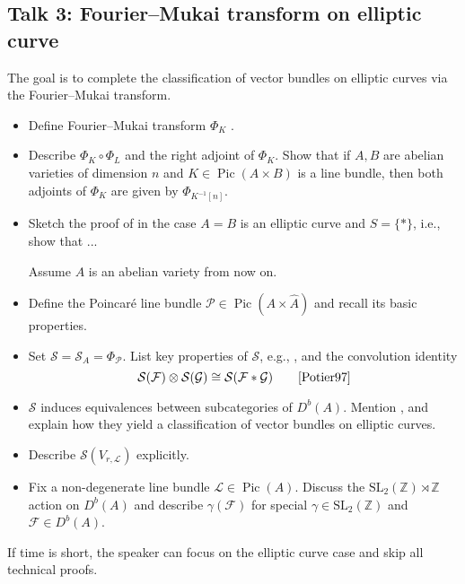 \documentclass[UTF8]{amsart}
\numberwithin{equation}{section}
\theoremstyle{plain}
\numberwithin{equation}{section}
\theoremstyle{remark}
\DeclareMathOperator{\Pic}{\operatorname{Pic}}
\begin{document}
\subsection*{Talk 3: Fourier--Mukai transform on elliptic curve}

The goal is to complete the classification of vector bundles on elliptic curves via the Fourier--Mukai transform.

\begin{itemize}
\item Define Fourier--Mukai transform $\Phi_K$ \cite[Chapter 11]{Potier97}.
\item Describe $\Phi_K \circ \Phi_L$ and the right adjoint of $\Phi_K$. Show that if $A, B$ are abelian varieties of dimension $n$ and $K \in \Pic(A \times B)$ is a line bundle, then both adjoints of $\Phi_K$ are given by $\Phi_{K^{-1}[n]}$.
\item Sketch the proof of \cite[Theorem 11.4]{Potier97} in the case $A = B$ is an elliptic curve and $S = \{*\}$, i.e., show that ...

\noindent \hspace{-8mm}Assume $A$ is an abelian variety from now on.

\item Define the Poincaré line bundle $\mathcal{P} \in \Pic(A \times \hat{A})$ and recall its basic properties.
\item Set $\mathcal{S} = \mathcal{S}_A = \Phi_{\mathcal{P}}$. List key properties of $\mathcal{S}$, e.g., \cite[(11.3.1)–(11.3.4), Theorem 11.6]{Potier97}, and the convolution identity
$$\mathcal{S}(\mathcal{F}) \otimes \mathcal{S}(\mathcal{G}) \cong \mathcal{S}(\mathcal{F}*\mathcal{G}) \qquad \text{\cite[p141]{Potier97}}$$

\item  $\mathcal{S}$ induces equivalences between subcategories of $D^b(A)$. Mention \cite[Proposition 11.8, Lemma 14.6, Theorem 14.7]{Potier97}, and explain how they yield a classification of vector bundles on elliptic curves.
\item Describe $\mathcal{S}(V_{r,\mathcal{L}})$ explicitly.
\item Fix a non-degenerate line bundle $\mathcal{L} \in \Pic(A)$. Discuss the $\mathrm{SL}_2(\mathbb{Z}) \rtimes \mathbb{Z}$ action on $D^b(A)$ and describe $\gamma(\mathcal{F})$ for special $\gamma \in \mathrm{SL}_2(\mathbb{Z})$ and $\mathcal{F} \in D^b(A)$.
\end{itemize}
If time is short, the speaker can focus on the elliptic curve case and skip all technical proofs.
\end{document}

